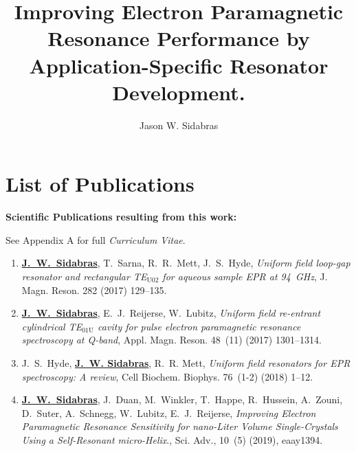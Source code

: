 \documentclass[11pt,a4paper,openany,twoside,english,titlepage=true]{scrbook}
\author{Jason W. Sidabras}
\title{Improving Electron Paramagnetic Resonance Performance by Application-Specific Resonator Development.}
\begin{document}
\raggedbottom
{}

\maketitle






\newpage
\chapter*{List of Publications}

\textbf{Scientific Publications resulting from this work: }

See Appendix A for full \textit{Curriculum Vitae}.
\begin{enumerate}
\itemsep0em
    \item \textbf{\underline{J.~W.~Sidabras}}, T.~Sarna, R.~R.~Mett, J.~S.~Hyde, {\em Uniform field loop-gap
  resonator and rectangular {TE}$_{\text{{U}02}}$ for aqueous sample {EPR} at 94~{GHz}}, J. Magn. Reson. 282 (2017) 129--135.
    \item \textbf{\underline{J.~W.~Sidabras}}, E.~J.~Reijerse, W.~Lubitz, {\em Uniform field re-entrant cylindrical
  {TE}$_{\text{01{U}}}$ cavity for pulse electron paramagnetic resonance spectroscopy at {Q}-band}, Appl. Magn. Reson. 48~(11) (2017) 1301--1314.
    \item J.~S.~Hyde, \textbf{\underline{J.~W. Sidabras}}, R.~R. Mett, {\em Uniform field resonators for {EPR}
  spectroscopy: A review}, Cell Biochem. Biophys. 76~(1-2) (2018) 1--12.
    \item \textbf{\underline{J.~W.~Sidabras}}, J.~Duan, M.~Winkler, T.~Happe, R.~Hussein, A.~Zouni, D.~Suter,
  A.~Schnegg, W.~Lubitz, E.~J.~Reijerse, {\em Improving Electron Paramagnetic Resonance Sensitivity for nano-Liter Volume Single-Crystals Using a Self-Resonant micro-Helix}., Sci. Adv., 10~(5) (2019), eaay1394.
\end{enumerate}

\makeatletter
\renewcommand{\@pnumwidth}{1.75em} 
\renewcommand{\@tocrmarg}{2em}
\makeatother
\tableofcontents\newpage
\end{document}
